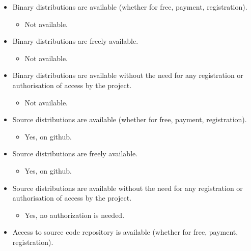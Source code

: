 \begin{itemize}
\itemsep1pt\parskip0pt
\item
  Binary distributions are available (whether for free, payment,
  registration).

  \begin{itemize}
  \itemsep1pt\parskip0pt
  \item
    Not available.
  \end{itemize}
\item
  Binary distributions are freely available.

  \begin{itemize}
  \itemsep1pt\parskip0pt
  \item
    Not available.
  \end{itemize}
\item
  Binary distributions are available without the need for any
  registration or authorisation of access by the project.

  \begin{itemize}
  \itemsep1pt\parskip0pt
  \item
    Not available.
  \end{itemize}
\item
  Source distributions are available (whether for free, payment,
  registration).

  \begin{itemize}
  \itemsep1pt\parskip0pt
  \item
    Yes, on github.
  \end{itemize}
\item
  Source distributions are freely available.

  \begin{itemize}
  \itemsep1pt\parskip0pt
  \item
    Yes, on github.
  \end{itemize}
\item
  Source distributions are available without the need for any
  registration or authorisation of access by the project.

  \begin{itemize}
  \itemsep1pt\parskip0pt
  \item
    Yes, no authorization is needed.
  \end{itemize}
\item
  Access to source code repository is available (whether for free,
  payment, registration).


\end{itemize}
